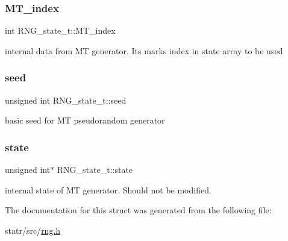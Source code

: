 \subsubsection{\texorpdfstring{M\+T\+\_\+index}{MT\_index}}
{\footnotesize\ttfamily int R\+N\+G\+\_\+state\+\_\+t\+::\+M\+T\+\_\+index}

internal data from MT generator. It\textquotesingle{}s marks index in state array to be used \mbox{\label{structRNG__state__t_a5c04ee01672b14c4c6f5d21c45aeb371}} 
\subsubsection{\texorpdfstring{seed}{seed}}
{\footnotesize\ttfamily unsigned int R\+N\+G\+\_\+state\+\_\+t\+::seed}

basic seed for MT pseudorandom generator \mbox{\label{structRNG__state__t_a7eb0b3b656d81709d34ecb90ccb21e73}} 
\subsubsection{\texorpdfstring{state}{state}}
{\footnotesize\ttfamily unsigned int$\ast$ R\+N\+G\+\_\+state\+\_\+t\+::state}

internal state of MT generator. Should not be modified. 

The documentation for this struct was generated from the following file\+:\begin{DoxyCompactItemize}
\item 
statr/src/\hyperlink{rng_8h}{rng.\+h}\end{DoxyCompactItemize}
